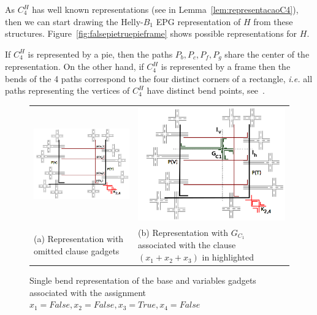 \documentclass[
submission
]{dmtcs-episciences}
\begin{document}
As $C_4^{H}$ has well known representations (see in Lemma~\ref{lem:representacaoC4}), then we can start drawing the Helly-$B_1$ EPG representation of $H$ from these structures.  Figure~\ref{fig:falsepietruepieframe} shows possible representations for $H$.



If $C_4^{H}$ is represented by a pie, then the paths $P_{b}, P_{c}, P_{f}, P_{g}$ share the center of the representation. On the other hand, if $C_4^{H}$ is represented by a frame then the bends of the 4 paths correspond to the four distinct corners of a rectangle, \textit{i.e.} all paths representing the vertices of $C_4^{H}$ have distinct bend points, see~\cite{golumbic2009}.

%
\begin{figure}[H]
  \centering
  \begin{tabular}{p{7cm} p{7cm} }
   \centering \includegraphics[width=7cm, left]{gadgetBasePlusVariables} &   %
  \includegraphics[width=7cm, left]{gadgetBasePlusVariablesOnePie}%
  \\
  [\abovecaptionskip]
    \footnotesize \centering (a) Representation with omitted clause gadgets &
  \footnotesize(b) Representation with  $G_{C_1}$  associated with the clause $(x_1+x_2+x_3)$ in highlighted \\
  \end{tabular}

 \caption{Single bend representation of the base and variables gadgets associated with the assignment $x_1=False, x_2=False, x_3=True, x_4=False$} \label{fig:gadgetOnePie} \label{fig:gadgetBasePlusVariables}
\end{figure}
\end{document}
